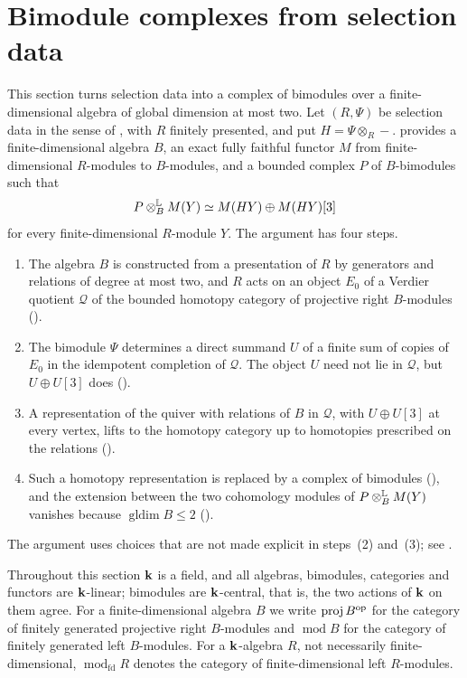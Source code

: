 \section{Bimodule complexes from selection data}
\label{sec:realisation}

This section turns selection data into a complex of bimodules over a
finite-dimensional algebra of global dimension at most two. Let $(R,\Psi)$ be
selection data in the sense of , with $R$ finitely
presented, and put ${H=\Psi\otimes_R-}$.  provides a
finite-dimensional algebra $B$, an exact fully faithful functor $M$ from
finite-dimensional $R$-modules to $B$-modules, and a bounded complex $P$ of
$B$-bimodules such that
\[
  P\Lotimes[B]M(Y)\simeq M(HY)\oplus M(HY)[3]
\]
for every finite-dimensional $R$-module $Y$. The argument has four steps.
\begin{enumerate}
  \item The algebra $B$ is constructed from a presentation of $R$ by generators
    and relations of degree at most two, and $R$ acts on an object $E_0$ of a
    Verdier quotient $\mathcal{Q}$ of the bounded homotopy category of
    projective right $B$-modules ().
  \item The bimodule $\Psi$ determines a direct summand $U$ of a finite sum of
    copies of $E_0$ in the idempotent completion of $\mathcal{Q}$. The object
    $U$ need not lie in $\mathcal{Q}$, but ${U\oplus U[3]}$ does
    ().
  \item A representation of the quiver with relations of $B$ in
    $\mathcal{Q}$, with ${U\oplus U[3]}$ at every vertex, lifts to the homotopy
    category up to homotopies prescribed on the relations
    ().
  \item Such a homotopy representation is replaced by a complex of
    bimodules (), and the extension between the
    two cohomology modules of ${P\Lotimes[B]M(Y)}$ vanishes because
    ${\operatorname{gldim}B\leq2}$ ().
\end{enumerate}
The argument uses choices that are not made explicit in steps~(2) and~(3); see
.

Throughout this section $\mathbf{k}$ is a field, and all algebras, bimodules,
categories and functors are $\mathbf{k}$-linear; bimodules are $\mathbf{k}$-central, that is,
the two actions of $\mathbf{k}$ on them agree. For a finite-dimensional algebra $B$ we
write $\operatorname{proj}B^{\mathrm{op}}$ for the category of finitely generated
projective right $B$-modules and $\operatorname{mod}B$ for the category of
finitely generated left $B$-modules. For a $\mathbf{k}$-algebra $R$, not necessarily
finite-dimensional, $\operatorname{mod}_{\mathrm{fd}}R$ denotes the category of
finite-dimensional left $R$-modules.

